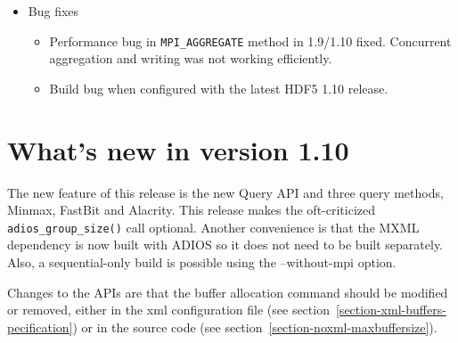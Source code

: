 \begin{itemize}
\item Bug fixes
    \begin{itemize}
    \item Performance bug in \verb+MPI_AGGREGATE+ method in 1.9/1.10 fixed. Concurrent aggregation and writing was not working efficiently.  
    \item Build bug when configured with the latest HDF5 1.10 release. 
    \end{itemize}
\end{itemize}



\section {What's new in version 1.10}
The new feature of this release is the new Query API and three query methods, Minmax, FastBit and Alacrity. This release makes the oft-criticized \verb+adios_group_size()+ call optional. Another convenience is that the MXML dependency is now built with ADIOS so it does not need to be built separately. Also, a sequential-only build is possible using the --without-mpi option. 

Changes to the APIs are that the buffer allocation command should be modified or removed, either in the xml configuration file (see section~\ref{section-xml-buffers-pecification}) or in the source code (see section~\ref{section-noxml-maxbuffersize}).

